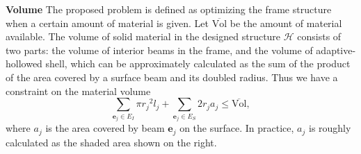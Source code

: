 \noindent\textbf{Volume}
%
The proposed problem is defined as optimizing the frame structure when a certain amount of material is given.
%
Let $\overline{\mathrm{Vol}}$ be the amount of material available.
The volume of solid material in the designed structure $\mathcal{H}$ consists of two parts:
the volume of interior beams in the frame, and the volume of adaptive-hollowed shell, which can be approximately calculated as
the sum of the product of the area covered by a surface beam and its doubled radius.
%
Thus we have a constraint on the material volume
\begin{equation} \label{eq:volume}
\sum_{\mathbf{e}_j\in E_I} \pi {r_j}^2 l_j + \sum_{\mathbf{e}_j\in E_S} 2 r_j a_j  \leqslant \overline{\mathrm{Vol}},
\end{equation}
where $a_j$ is the area covered by beam $\mathbf{e}_j$ on the surface.
In practice, $a_j$ is roughly calculated as the shaded area shown on the right.



%




